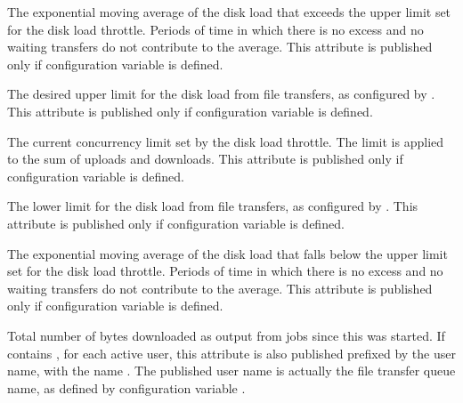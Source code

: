 \begin{description}

\item[\AdAttr{FileTransferDiskThrottleExcess\_<timespan>}]
  The exponential moving average of the disk load that exceeds the
  upper limit set for the disk load throttle.  Periods of time in
  which there is no excess and no waiting transfers do not contribute
  to the average.
  This attribute is published only if configuration variable 
   is defined.

\item[\AdAttr{FileTransferDiskThrottleHigh}]
  The desired upper limit for the disk load from file transfers, as configured
  by .
  This attribute is published only if configuration variable 
   is defined.

\item[\AdAttr{FileTransferDiskThrottleLevel}]
  The current concurrency limit set by the disk load throttle.  The limit is
  applied to the sum of uploads and downloads.
  This attribute is published only if configuration variable 
   is defined.

\item[\AdAttr{FileTransferDiskThrottleLow}]
  The lower limit for the disk load from file transfers, as configured
  by .
  This attribute is published only if configuration variable 
   is defined.

\item[\AdAttr{FileTransferDiskThrottleShortfall\_<timespan>}]
  The exponential moving average of the disk load that falls below the
  upper limit set for the disk load throttle.  Periods of time in
  which there is no excess and no waiting transfers do not contribute
  to the average.
  This attribute is published only if configuration variable 
   is defined.

\item[\AdAttr{FileTransferDownloadBytes}] Total number of bytes
  downloaded as output from jobs since this  was
  started.
  If  contains ,
  for each active user, this attribute is also published prefixed by
  the user name, with the name .
  The published user name is actually the file transfer queue name, as
  defined by configuration variable .


\end{description}
